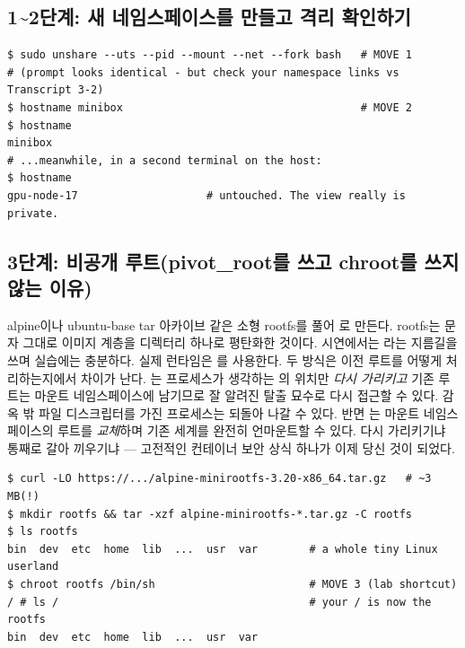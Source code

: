 \subsection*{1\textasciitilde{}2단계: 새 네임스페이스를 만들고 격리 확인하기}

\begin{terminalbox}
\begin{Verbatim}[breaklines=true,breakanywhere=true,fontsize=\small,formatcom=\color{tbbtermfg},codes=\tbbcodeactive]
$ sudo unshare --uts --pid --mount --net --fork bash   # MOVE 1
# (prompt looks identical - but check your namespace links vs Transcript 3-2)
$ hostname minibox                                     # MOVE 2
$ hostname
minibox
# ...meanwhile, in a second terminal on the host:
$ hostname
gpu-node-17                    # untouched. The view really is private.
\end{Verbatim}
\end{terminalbox}

\subsection*{3단계: 비공개 루트(pivot\_root를 쓰고 chroot를 쓰지 않는 이유)}

alpine이나 ubuntu-base tar 아카이브 같은 소형 rootfs를 풀어 \code{/\allowbreak }로 만든다. rootfs는 문자 그대로 이미지 계층을 디렉터리 하나로 평탄화한 것이다. 시연에서는 라는 지름길을 쓰며 실습에는 충분하다. 실제 런타임은 를 사용한다. 두 방식은 이전 루트를 어떻게 처리하는지에서 차이가 난다. 는 프로세스가 생각하는 \code{/\allowbreak }의 위치만 \textit{다시 가리키고} 기존 루트는 마운트 네임스페이스에 남기므로 잘 알려진 탈출 묘수로 다시 접근할 수 있다. 감옥 밖 파일 디스크립터를 가진 프로세스는 되돌아 나갈 수 있다. 반면 는 마운트 네임스페이스의 루트를 \textit{교체}하며 기존 세계를 완전히 언마운트할 수 있다. 다시 가리키기냐 통째로 갈아 끼우기냐 — 고전적인 컨테이너 보안 상식 하나가 이제 당신 것이 되었다.

\begin{terminalbox}
\begin{Verbatim}[breaklines=true,breakanywhere=true,fontsize=\small,formatcom=\color{tbbtermfg},codes=\tbbcodeactive]
$ curl -LO https://.../alpine-minirootfs-3.20-x86_64.tar.gz   # ~3 MB(!)
$ mkdir rootfs && tar -xzf alpine-minirootfs-*.tar.gz -C rootfs
$ ls rootfs
bin  dev  etc  home  lib  ...  usr  var        # a whole tiny Linux userland
$ chroot rootfs /bin/sh                        # MOVE 3 (lab shortcut)
/ # ls /                                       # your / is now the rootfs
bin  dev  etc  home  lib  ...  usr  var
\end{Verbatim}
\end{terminalbox}


